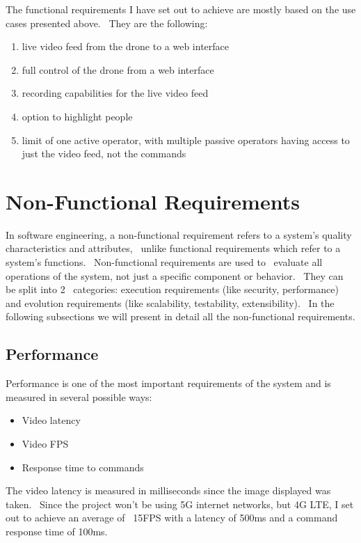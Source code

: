 The functional requirements I have set out to achieve are mostly based on the use cases presented above. \
They are the following:
\begin{enumerate}
    \item live video feed from the drone to a web interface
    \item full control of the drone from a web interface
    \item recording capabilities for the live video feed
    \item option to highlight people
    \item limit of one active operator, with multiple passive operators having access to just the video feed, not the commands
\end{enumerate}

\section{Non-Functional Requirements}
\label{sec:non-functional-requirements}

In software engineering, a non-functional requirement refers to a system's quality characteristics and attributes, \
unlike functional requirements which refer to a system's functions. \
Non-functional requirements are used to \
evaluate all operations of the system, not just a specific component or behavior. \
They can be split into 2 \
categories: execution requirements (like security, performance) and evolution requirements (like scalability,
testability, extensibility). \
In the following subsections we will present in detail all the non-functional requirements.

\subsection{Performance}
\label{subsec:specification-performance}
Performance is one of the most important requirements of the system and is measured in several possible ways:
\begin{itemize}
    \item Video latency
    \item Video FPS
    \item Response time to commands
\end{itemize}

The video latency is measured in milliseconds since the image displayed was taken. \
Since the project won't be using 5G internet networks, but 4G LTE, I set out to achieve an average of \
15FPS with a latency of 500ms and a command response time of 100ms.

